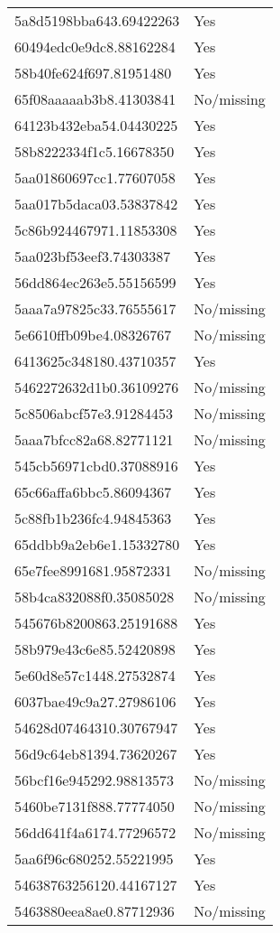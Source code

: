 \begin{tabular}{ll}
5a8d5198bba643.69422263 & Yes \\
60494edc0e9dc8.88162284 & Yes \\
58b40fe624f697.81951480 & Yes \\
65f08aaaaab3b8.41303841 & No/missing \\
64123b432eba54.04430225 & Yes \\
58b8222334f1c5.16678350 & Yes \\
5aa01860697cc1.77607058 & Yes \\
5aa017b5daca03.53837842 & Yes \\
5c86b924467971.11853308 & Yes \\
5aa023bf53eef3.74303387 & Yes \\
56dd864ec263e5.55156599 & Yes \\
5aaa7a97825c33.76555617 & No/missing \\
5e6610ffb09be4.08326767 & No/missing \\
6413625c348180.43710357 & Yes \\
5462272632d1b0.36109276 & No/missing \\
5c8506abcf57e3.91284453 & No/missing \\
5aaa7bfcc82a68.82771121 & No/missing \\
545cb56971cbd0.37088916 & Yes \\
65c66affa6bbc5.86094367 & Yes \\
5c88fb1b236fc4.94845363 & Yes \\
65ddbb9a2eb6e1.15332780 & Yes \\
65e7fee8991681.95872331 & No/missing \\
58b4ca832088f0.35085028 & No/missing \\
545676b8200863.25191688 & Yes \\
58b979e43c6e85.52420898 & Yes \\
5e60d8e57c1448.27532874 & Yes \\
6037bae49c9a27.27986106 & Yes \\
54628d07464310.30767947 & Yes \\
56d9c64eb81394.73620267 & Yes \\
56bcf16e945292.98813573 & No/missing \\
5460be7131f888.77774050 & No/missing \\
56dd641f4a6174.77296572 & No/missing \\
5aa6f96c680252.55221995 & Yes \\
54638763256120.44167127 & Yes \\
5463880eea8ae0.87712936 & No/missing \\

\end{tabular}

